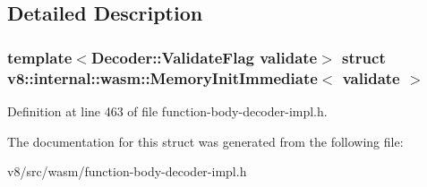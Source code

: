 \subsection{Detailed Description}
\subsubsection*{template$<$Decoder\+::\+Validate\+Flag validate$>$\newline
struct v8\+::internal\+::wasm\+::\+Memory\+Init\+Immediate$<$ validate $>$}



Definition at line 463 of file function-\/body-\/decoder-\/impl.\+h.



The documentation for this struct was generated from the following file\+:\begin{DoxyCompactItemize}
\item 
v8/src/wasm/function-\/body-\/decoder-\/impl.\+h\end{DoxyCompactItemize}
